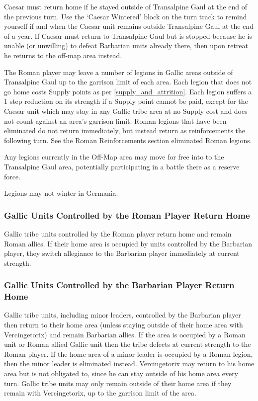 Caesar must return home if he stayed outside of Transalpine Gaul at the end of the previous turn. Use the ‘Caesar Wintered’ block on the turn track to remind yourself if and when the Caesar unit remains outside Transalpine Gaul at the end of a year. If Caesar must return to Transalpine Gaul but is stopped because he is unable (or unwilling) to defeat Barbarian units already there, then upon retreat he returns to the off-map area instead.

The Roman player may leave a number of legions in Gallic areas outside of Transalpine Gaul up to the garrison limit of each area. Each legion that does not go home costs Supply points as per \ref{supply_and_attrition}. Each legion suffers a 1 step reduction on its strength if a Supply point cannot be paid, except for the Caesar unit which may stay in any Gallic tribe area at no Supply cost and does not count against an area's garrison limit. Roman legions that have been eliminated do not return immediately, but instead return as reinforcements the following turn. See the Roman Reinforcements section eliminated Roman legions.

Any legions currently in the Off-Map area may move for free into to the Transalpine Gaul area, potentially participating in a battle there as a reserve force.

Legions may not winter in Germania.

\subsubsection{Gallic Units Controlled by the Roman Player Return Home}
\par
Gallic tribe units controlled by the Roman player return home and remain Roman allies. If their home area is occupied by units controlled by the Barbarian player, they switch allegiance to the Barbarian player immediately at current strength.

\subsubsection{Gallic Units Controlled by the Barbarian Player Return Home}
\par
Gallic tribe units, including minor leaders, controlled by the Barbarian player then return to their home area (unless staying outside of their home area with Vercingetorix) and remain Barbarian allies. If the area is occupied by a Roman unit or Roman allied Gallic unit then the tribe defects at current strength to the Roman player. If the home area of a minor leader is occupied by a Roman legion, then the minor leader is eliminated instead. Vercingetorix may return to his home area but is not obligated to, since he can stay outside of his home area every turn. Gallic tribe units may only remain outside of their home area if they remain with Vercingetorix, up to the garrison limit of the area.

